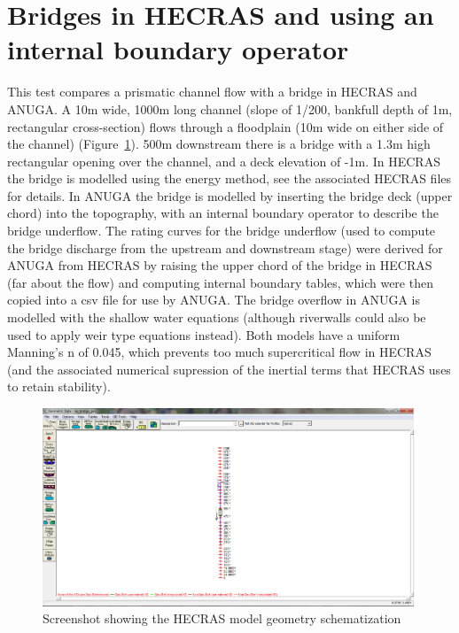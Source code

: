 \section{Bridges in HECRAS and \anuga{} using an internal boundary operator}
This test compares a prismatic channel flow with a bridge in HECRAS and ANUGA.
A 10m wide, 1000m long channel (slope of 1/200, bankfull depth of 1m,
rectangular cross-section) flows through a floodplain (10m wide on either side
of the channel) (Figure~\ref{schematic}). 500m downstream there is a bridge
with a 1.3m high rectangular opening over the channel, and a deck elevation of
-1m. In HECRAS the bridge is modelled using the energy method, see the
associated HECRAS files for details. In ANUGA the bridge is modelled by
inserting the bridge deck (upper chord) into the topography, with an internal
boundary operator to describe the bridge underflow. The rating curves for the
bridge underflow (used to compute the bridge discharge from the upstream and
downstream stage) were derived for ANUGA from HECRAS by raising the upper chord
of the bridge in HECRAS (far about the flow) and computing internal boundary
tables, which were then copied into a csv file for use by ANUGA. The bridge
overflow in ANUGA is modelled with the shallow water equations (although
riverwalls could also be used to apply weir type equations instead). Both
models have a uniform Manning's n of 0.045, which prevents too much
supercritical flow in HECRAS (and the associated numerical supression of the
inertial terms that HECRAS uses to retain stability).

\begin{figure}
\begin{center}
\includegraphics[width=1.0\textwidth]{hecras_bridge_test/RASGeometry_Bridge.png}
\end{center}
\caption{Screenshot showing the HECRAS model geometry schematization}
\label{schematic}
\end{figure}


